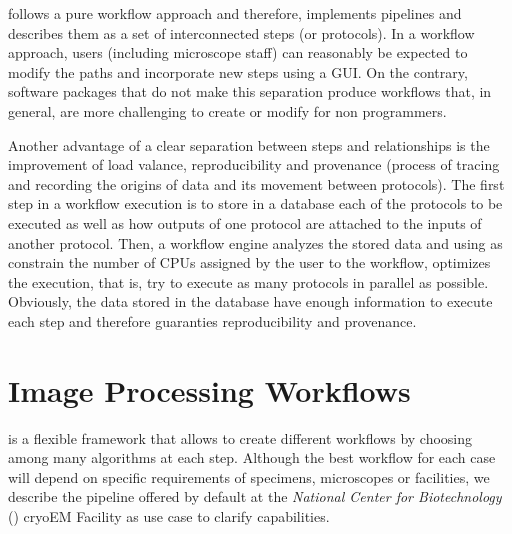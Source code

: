 \scipion follows a pure workflow approach and therefore, implements pipelines and describes them as a set of interconnected steps (or protocols). In a workflow approach, users (including microscope staff) can reasonably be expected to modify the paths and incorporate new steps using a GUI. On the contrary, software packages that do not make this separation produce workflows that, in general, are more challenging to create or modify for non programmers. 

Another advantage of a clear separation between steps and relationships 
is the improvement of load valance, reproducibility and  provenance (process of tracing and recording the origins of data and its movement between protocols). The first step in a \scipion workflow execution
is to store in a database each of the protocols to be executed as well as how 
outputs of one protocol are attached to the inputs of another protocol. Then, a workflow engine analyzes the stored data and using as constrain the number of CPUs assigned by the user to the workflow, optimizes the execution, that is, try to execute as many protocols in parallel as possible. Obviously, the data stored in the database  have enough information to execute each step and therefore guaranties reproducibility and provenance.






\section{Image Processing Workflows}

\scipion is a flexible framework that allows to create different workflows by choosing among many algorithms at each step. Although the best workflow for each case will depend on specific requirements of specimens, microscopes or facilities, we  describe the pipeline offered by default at the \emph{National Center for Biotechnology} (\cnb) cryoEM Facility as use case to clarify \scipion capabilities.

